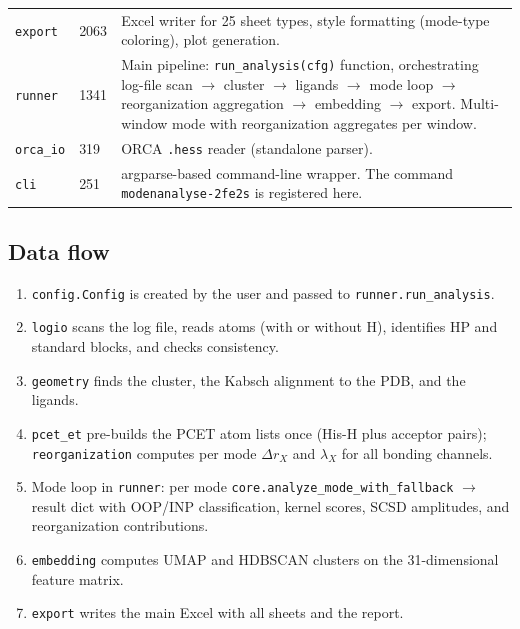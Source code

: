 \documentclass[11pt,a4paper,twoside]{article}
\theoremstyle{remark}
\begin{document}
\begin{longtable}{p{} p{} p{}}
\texttt{export} & 2063 & Excel writer for 25 sheet types, style
  formatting (mode-type coloring), plot generation. \\

\texttt{runner} & 1341 & Main pipeline:
  \texttt{run\_analysis(cfg)} function, orchestrating
  log-file scan $\to$ cluster $\to$ ligands $\to$ mode loop
  $\to$ reorganization aggregation $\to$ embedding $\to$ export.
  Multi-window mode with reorganization aggregates per window. \\

\texttt{orca\_io} & 319 & ORCA \texttt{.hess} reader (standalone
  parser). \\

\texttt{cli} & 251 & argparse-based command-line wrapper. The
  command \texttt{modenanalyse-2fe2s} is registered here. \\

\bottomrule
\end{longtable}

\subsection{Data flow}

\begin{enumerate}
  \item \texttt{config.Config} is created by the user and passed
        to \texttt{runner.run\_analysis}.
  \item \texttt{logio} scans the log file, reads atoms (with or
        without H), identifies HP and standard blocks, and checks
        consistency.
  \item \texttt{geometry} finds the cluster, the Kabsch alignment
        to the PDB, and the ligands.
  \item \texttt{pcet\_et} pre-builds the PCET atom lists once
        (His-H plus acceptor pairs); \texttt{reorganization}
        computes per mode $\Delta r_X$ and $\lambda_X$ for all
        bonding channels.
  \item Mode loop in \texttt{runner}: per mode
        \texttt{core.analyze\_mode\_with\_fallback} $\to$ result
        dict with OOP/INP classification, kernel scores, SCSD
        amplitudes, and reorganization contributions.
  \item \texttt{embedding} computes UMAP and HDBSCAN clusters on
        the 31-dimensional feature matrix.
  \item \texttt{export} writes the main Excel with all sheets and
        the report.
\end{enumerate}
\end{document}
